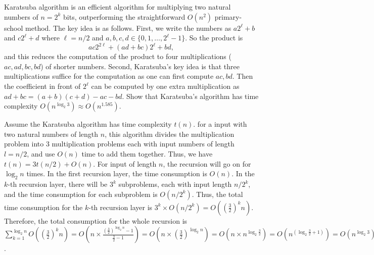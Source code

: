 \documentclass{homework}
\begin{document}
\begin{problem}
  Karatsuba algorithm is an efficient algorithm for multiplying two natural
  numbers of $n = 2^{k}$ bits, outperforming the straightforward $O(n^{2})$
  primary-school method.
  The key idea is as follows.
  First, we write the numbers as $a 2^{\ell} + b$ and $c 2^{\ell} + d$ where
  $\ell = n/2$ and $a, b, c, d \in \{0, 1, \ldots, 2^{\ell}-1\}$.
  So the product is
  \begin{equation*}
    ac2^{2\ell} + (ad+bc) 2^{\ell} + bd,
  \end{equation*}
  and this reduces the computation of the product to four multiplications
  ($ac, ad, bc, bd$) of shorter numbers.
  Second, Karatsuba's key idea is that three multiplications suffice for the
  computation as one can first compute $ac, bd$.
  Then the coefficient in front of $2^{\ell}$ can be computed by one extra
  multiplication as $ad+bc = (a+b)(c+d) - ac -bd$.
  Show that Karatsuba's algorithm has time complexity
  $O(n^{\log_{2} 3}) \approx O(n^{1.585})$.
\end{problem}

\begin{solution}
Assume the Karatsuba algorithm has time complexity $t(n)$. for a input with two natural numbers of length $n$, this algorithm divides the multiplication problem into 3 multiplication problems each with input numbers of length $l=n/2$, and use $O(n)$ time to add them together. Thus, we have $t(n)=3t(n/2)+O(n)$. For input of length $n$, the recursion will go on for $\log_2n$ times. In the first recursion layer, the time consumption is $O(n)$. In the $k$-th recursion layer, there will be $3^k$ subproblems, each with input length $n/2^k$, and the time consumption for each subproblem is $O(n/2^k)$. Thus, the total time consumption for the $k$-th recursion layer is $3^k\times O(n/2^k)=O((\frac{3}{2})^k n)$. Therefore, the total consumption for the whole recursion is $\sum_{k=1}^{\log_2n}O((\frac{3}{2})^k n)=O(n\times\frac{(\frac{3}{2})^{\log_2n}-1}{\frac{3}{2}-1}) = O(n\times (\frac{3}{2})^{\log_2n}) = O(n\times n^{\log_2\frac{3}{2}}) = O(n^{(\log_2\frac{3}{2}+1)}) = O(n^{\log_2 3})$.
\end{solution}
\end{document}
